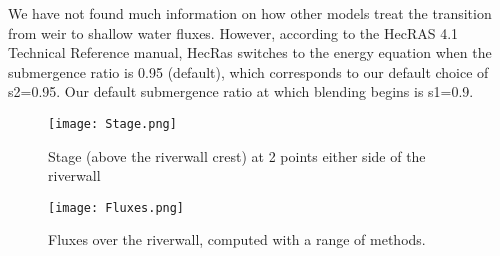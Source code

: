We have not found much information on how other models treat the transition from weir to shallow water fluxes. However, according to the HecRAS 4.1 Technical Reference manual, HecRas switches to the energy equation when the submergence ratio is 0.95 (default), which corresponds to our default choice of s2=0.95. Our default submergence ratio at which blending begins is s1=0.9.

\begin{figure}
\begin{center}
\texttt{[image: Stage.png]}
\end{center}
\caption{Stage (above the riverwall crest) at 2 points either side of the riverwall}
\end{figure}


\begin{figure}
\begin{center}
\texttt{[image: Fluxes.png]}
\end{center}
\caption{Fluxes over the riverwall, computed with a range of methods.}
\end{figure}

\endinput
